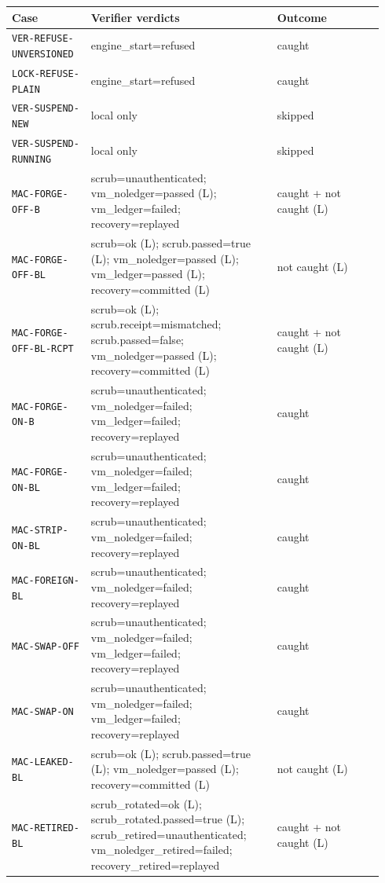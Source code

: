
\begin{tabular}{@{}p{0.2\linewidth}p{0.47\linewidth}p{0.27\linewidth}@{}}
\toprule
Case & Verifier verdicts & Outcome \\
\midrule
\texttt{VER-REFUSE-UNVERSIONED} & engine\_start=refused & caught \\
\texttt{LOCK-REFUSE-PLAIN} & engine\_start=refused & caught \\
\texttt{VER-SUSPEND-NEW} & local only & skipped \\
\texttt{VER-SUSPEND-RUNNING} & local only & skipped \\
\texttt{MAC-FORGE-OFF-B} & scrub=unauthenticated; vm\_noledger=passed (L); vm\_ledger=failed; recovery=replayed & caught + not caught (L) \\
\texttt{MAC-FORGE-OFF-BL} & scrub=ok (L); scrub.passed=true (L); vm\_noledger=passed (L); vm\_ledger=passed (L); recovery=committed (L) & not caught (L) \\
\texttt{MAC-FORGE-OFF-BL-RCPT} & scrub=ok (L); scrub.receipt=mismatched; scrub.passed=false; vm\_noledger=passed (L); recovery=committed (L) & caught + not caught (L) \\
\texttt{MAC-FORGE-ON-B} & scrub=unauthenticated; vm\_noledger=failed; vm\_ledger=failed; recovery=replayed & caught \\
\texttt{MAC-FORGE-ON-BL} & scrub=unauthenticated; vm\_noledger=failed; vm\_ledger=failed; recovery=replayed & caught \\
\texttt{MAC-STRIP-ON-BL} & scrub=unauthenticated; vm\_noledger=failed; recovery=replayed & caught \\
\texttt{MAC-FOREIGN-BL} & scrub=unauthenticated; vm\_noledger=failed; recovery=replayed & caught \\
\texttt{MAC-SWAP-OFF} & scrub=unauthenticated; vm\_noledger=failed; vm\_ledger=failed; recovery=replayed & caught \\
\texttt{MAC-SWAP-ON} & scrub=unauthenticated; vm\_noledger=failed; vm\_ledger=failed; recovery=replayed & caught \\
\texttt{MAC-LEAKED-BL} & scrub=ok (L); scrub.passed=true (L); vm\_noledger=passed (L); recovery=committed (L) & not caught (L) \\
\texttt{MAC-RETIRED-BL} & scrub\_rotated=ok (L); scrub\_rotated.passed=true (L); scrub\_retired=unauthenticated; vm\_noledger\_retired=failed; recovery\_retired=replayed & caught + not caught (L) \\

\end{tabular}
